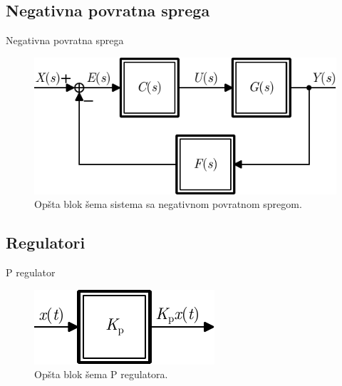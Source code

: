 \documentclass[aspectratio=169,xcolor=dvipsnames]{beamer}
\begin{document}


\subsection{Negativna povratna sprega}

\begin{frame}{Negativna povratna sprega}
    \begin{figure}
    \includegraphics[width=0.6\linewidth]{fig/nps.pdf}
    \caption{Opšta blok šema sistema sa negativnom povratnom spregom.}
    \end{figure}
\end{frame}


\subsection{Regulatori}

\begin{frame}{P regulator}
    \begin{figure}
    \includegraphics[width=0.3\linewidth]{fig/Preg.pdf}
    \caption{Opšta blok šema P regulatora.}
    \end{figure}
\end{frame}

\end{document}
